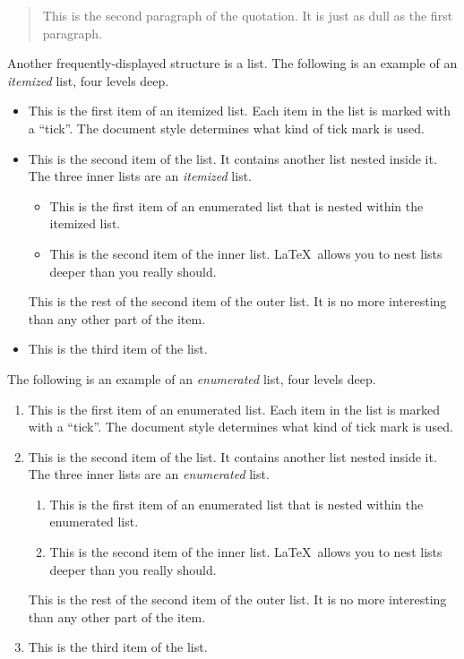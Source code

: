 \documentclass{kluwer}    %
\begin{document}
\begin{article}
\begin{quotation}
   This is the second paragraph of the quotation.  It is just
   as dull as the first paragraph.
\end{quotation}
Another frequently-displayed structure is a list.
The following is an example of an {\em itemized} list, four levels deep.
\begin{itemize}
\item  This is the first item of an itemized list.  Each item 
      in the list is marked with a ``tick''.  The document
      style determines what kind of tick mark is used.
\item  This is the second item of the list.  It contains another
      list nested inside it.  The three inner lists are an {\em itemized}
      list.
    \begin{itemize}
       \item This is the first item of an enumerated list that
            is nested within the itemized list.
          \item This is the second item of the inner list.  \LaTeX\
            allows you to nest lists deeper than you really should.
      \end{itemize}
      This is the rest of the second item of the outer list.  It
      is no more interesting than any other part of the item.
   \item  This is the third item of the list.
\end{itemize}


The following is an example of an {\em enumerated} list, four levels deep.
\begin{enumerate}
\item  This is the first item of an enumerated list.  Each item 
      in the list is marked with a ``tick''.  The document
      style determines what kind of tick mark is used.
\item  This is the second item of the list.  It contains another
      list nested inside it.  The three inner lists are an {\em enumerated}
      list.
    \begin{enumerate}
       \item This is the first item of an enumerated list that
            is nested within the enumerated list.
          \item This is the second item of the inner list.  \LaTeX\
            allows you to nest lists deeper than you really should.
      \end{enumerate}
      This is the rest of the second item of the outer list.  It
      is no more interesting than any other part of the item.
   \item  This is the third item of the list.
\end{enumerate}



\end{article}
\end{document}
